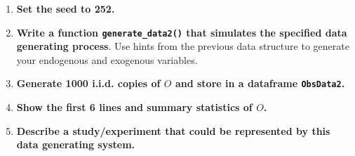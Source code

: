 \documentclass{exam}
\begin{document}
\begin{enumerate}
\item \textbf{Set the seed to 252.}
\item \textbf{Write a function \texttt{generate\_data2()} that simulates the specified data generating process}. Use hints from the previous data structure to generate your endogenous and exogenous variables. 
\item \textbf{Generate 1000 i.i.d. copies of $O$ and store in a dataframe \texttt{ObsData2}.}
\item \textbf{Show the first 6 lines and summary statistics of $O$.}
\item \textbf{Describe a study/experiment that could be represented by this data generating system.}
\end{enumerate}
\end{document}

